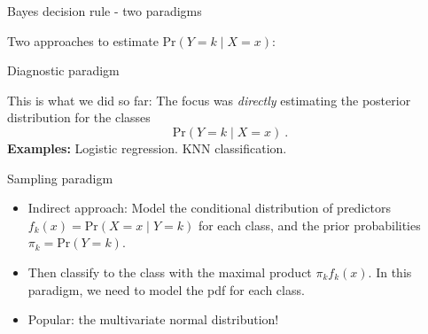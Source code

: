 \documentclass[10pt,ignorenonframetext,]{beamer}
\providecommand{\tightlist}{%
  \setlength{\itemsep}{0pt}\setlength{\parskip}{0pt}}
\begin{document}
\begin{frame}{Bayes decision rule - two paradigms}

\vspace{1mm}

Two approaches to estimate \(\text{Pr}(Y=k \mid X=x)\): \vspace{1mm}

\begin{block}{Diagnostic paradigm}

This is what we did so far: The focus was \emph{directly} estimating the
posterior distribution for the classes \[\text{Pr}(Y=k \mid X=x)\ .\]
\textbf{Examples:} Logistic regression. KNN classification.

\vspace{2mm}

\end{block}

\begin{block}{Sampling paradigm}

\begin{itemize}
\tightlist
\item
  Indirect approach: Model the conditional distribution of predictors
  \(f_k(x)=\text{Pr}(X=x \mid Y=k)\) for each class, and the prior
  probabilities \(\pi_k=\text{Pr}(Y=k)\).
\item
  Then classify to the class with the maximal product \(\pi_k f_k(x)\).
  In this paradigm, we need to model the pdf for each class.
\item
  Popular: the multivariate normal distribution!
\end{itemize}

\end{block}

\end{frame}
\end{document}

